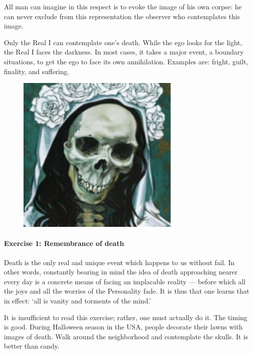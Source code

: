 \begin{quotex}
All man can imagine in this respect is to evoke the image of his own corpse: he can never exclude from this representation the observer who contemplates this image. 

\end{quotex}

Only the Real I can contemplate one's death. While the ego looks for the light, the Real I faces the darkness. In most cases, it takes a major event, a boundary situations, to get the ego to face its own annihilation. Examples are: fright, guilt, finality, and suffering.

\begin{figure}
\includegraphics[scale=.4]{a20191027DeathandtheRealI-img002.jpg} 
\end{figure}

\paragraph{Exercise 1: Remembrance of death}
\begin{quotex}
Death is the only real and unique event which happens to us without fail. In other words, constantly bearing in mind the idea of death approaching nearer every day is a concrete means of facing an implacable reality — before which all the joys and all the worries of the Personality fade. It is thus that one learns that in effect: `all is vanity and torments of the mind.' 

\end{quotex}
It is insufficient to read this exercise; rather, one must actually do it. The timing is good. During Halloween season in the USA, people decorate their lawns with images of death. Walk around the neighborhood and contemplate the skulls. It is better than candy.


